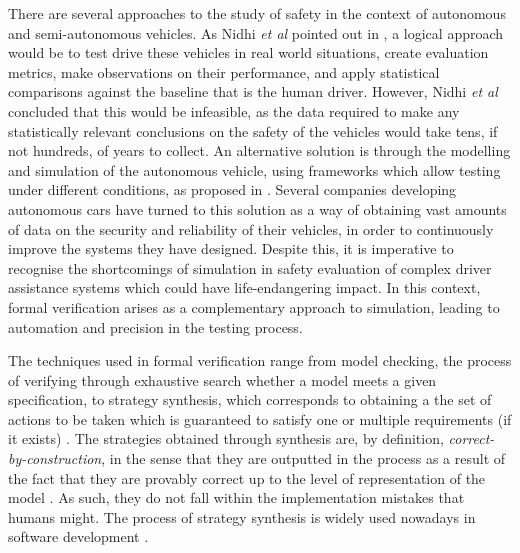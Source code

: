 There are several approaches to the study of safety in the context of autonomous and semi-autonomous vehicles. As Nidhi \textit{et al} pointed out in \cite{driving-to-safety}, a logical approach would be to test drive these vehicles in real world situations, create evaluation metrics, make observations on their performance, and apply statistical comparisons against the baseline that is the human driver. However, Nidhi \textit{et al} concluded that this would be infeasible, as the data required to make any statistically relevant conclusions on the safety of the vehicles would take tens, if not hundreds, of years to collect. An alternative solution is through the modelling and simulation of the autonomous vehicle, using frameworks which allow testing under different conditions, as proposed in \cite{sim1, sim2, sim3, sim4}. Several companies developing autonomous cars have turned to this solution as a way of obtaining vast amounts of data on the security and reliability of their vehicles, in order to continuously improve the systems they have designed. Despite this, it is imperative to recognise the shortcomings of simulation in safety evaluation of complex driver assistance systems \cite{challenges1, challenges2} which could have life-endangering impact. In this context, formal verification arises as a complementary approach to simulation, leading to automation and precision in the testing process.

The techniques used in formal verification range from model checking, the process of verifying through exhaustive search whether a model meets a given specification, to strategy synthesis, which corresponds to obtaining a the set of actions to be taken which is guaranteed to satisfy one or multiple requirements (if it exists) \cite{bk08, games2}. The strategies obtained through synthesis are, by definition, \textit{correct-by-construction}, in the sense that they are outputted in the process as a result of the fact that they are provably correct up to the level of representation of the model \cite{bk08, games2}. As such, they do not fall within the implementation mistakes that humans might. The process of strategy synthesis is widely used nowadays in software development \cite{software_1, software_2, software_3}. 

